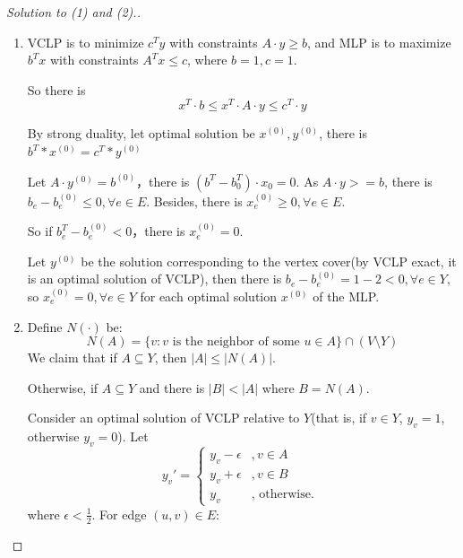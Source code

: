 \begin{proof}[Solution to (1) and (2).]
\begin{enumerate}
            So $K_4$ is an example which is MLP exact but not VCLP exact.
  
            In (3) and (4), suppose that $Y$ is a minimum vertex cover of $G$. Note that there is no edge $(u, v) \in E$ such that both $u, v \in V \setminus Y$. Because $u, v \in V \setminus Y$ means that $(u, v)$ is not covered by $Y$, which is contradict with $Y$ being a vertex cover.

            \item VCLP is to minimize $c^Ty$ with constraints $A\cdot y\geq b$, and MLP is to maximize $b^Tx$ with constraints $A^Tx\leq c$, where $b=1,c=1$. 
            
            So there is $$x^T \cdot b \leq x^T \cdot A \cdot y \leq c^T \cdot y$$

            By strong duality, let optimal solution be $x^{(0)},y^{(0)}$, there is $b^T * x^{(0)} = c^T * y^{(0)}$
            
            Let $A \cdot y^{(0)}=b^{(0)}$，there is $(b^T - b_0^T)\cdot x_0=0$. As $A\cdot y >= b$, there is $b_e-b^{(0)}_e\leq 0,\forall e\in E$. Besides, there is $x^{(0)}_e\geq 0,\forall e\in E$. 
            
            So if $b^T_e-b^{(0)}_e<0$，there is $x^{(0)}_e=0$. 

            Let $y^{(0)}$ be the solution corresponding to the vertex cover(by VCLP exact, it is an optimal solution of VCLP), then there is 
            $b_e-b^{(0)}_e=1-2<0,\forall e\in Y$, so $x^{(0)}_e=0,\forall e\in Y$ for each optimal solution $x^{(0)}$ of the MLP. 
            
            \item Define $N(\cdot)$ be: 
            $$N(A)=\{v:v\text{ is the neighbor of some }u\in A\}\cap (V \setminus Y)$$
            We claim that if $A\subseteq Y$, then $|A|\leq |N(A)|$. 

            Otherwise, if $A\subseteq Y$ and there is $|B|<|A|$ where $B=N(A)$. 

            Consider an optimal solution of VCLP relative to $Y$(that is, if $v\in Y$, $y_v=1$, otherwise $y_v=0$). Let 
            \begin{equation*}
                y_v'=
                \begin{cases}
                    y_v-\epsilon&,v\in A\\
                    y_v+\epsilon&,v\in B\\
                    y_v &,\text{ otherwise. }
                \end{cases}
            \end{equation*}
            where $\epsilon < \frac{1}{2}$. For edge $(u, v) \in E$: 
    

\end{enumerate}
\end{proof}
